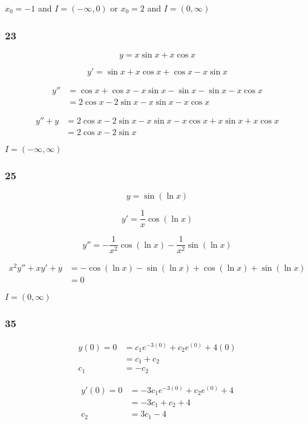 \documentclass{article}
\begin{document}
$x_0 = -1$ and $I = (-\infty, 0)$ or $x_0 = 2$ and $I = (0, \infty)$

\subsubsection{23}

\[y = x \sin x + x \cos x\]

\[y' = \sin x + x \cos x + \cos x - x \sin x\]

\begin{align*}
  y'' & = \cos x + \cos x - x \sin x - \sin x - \sin x - x \cos x \\
      & = 2 \cos x - 2 \sin x - x \sin x - x \cos x
\end{align*}

\begin{align*}
  y'' + y & = 2 \cos x - 2 \sin x - x \sin x - x \cos x + x \sin x + x \cos x \\
          & = 2 \cos x - 2 \sin x
\end{align*}

$I = (-\infty, \infty)$

\subsubsection{25}

\[y = \sin (\ln x)\]

\[y' = \frac{1}{x} \cos (\ln x)\]

\[y'' = -\frac{1}{x^2} \cos (\ln x) - \frac{1}{x^2} \sin (\ln x)\]

\begin{align*}
  x^2 y'' + x y' + y & = -\cos (\ln x) - \sin (\ln x) + \cos (\ln x) + \sin (\ln x) \\
                     & = 0
\end{align*}

$I = (0, \infty)$

\subsubsection{35}

\begin{align*}
  y(0) = 0 & = c_1 e^{-3 (0)} + c_2 e^{(0)} + 4 (0) \\
           & = c_1 + c_2                            \\
  c_1      & = -c_2
\end{align*}

\begin{align*}
  y'(0) = 0 & = -3 c_1 e^{-3 (0)} + c_2 e^{(0)} + 4 \\
            & = -3 c_1 + c_2 + 4                    \\
  c_2       & = 3 c_1 - 4
\end{align*}
\end{document}
